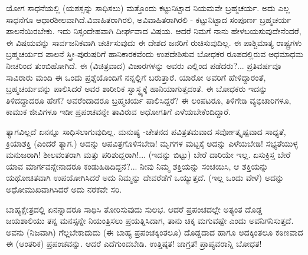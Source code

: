 ಯೋಗ ಸಾಧನೆಯಲ್ಲಿ (ಯಶಸ್ಸನ್ನು ಸಾಧಿಸಲು) ಮತ್ತೊಂದು ಕಟ್ಟುನಿಟ್ಟಾದ ನಿಯಮವೇ ಬ್ರಹ್ಮಚರ್ಯ. ಅದು ಎಲ್ಲ ಸಾಧನೆಗೂ ಆಧಾರಶೀಲವಾಗಿದೆ.\break ವಿವಾಹಿತರಾಗಿರಲಿ, ಅವಿವಾಹಿತರಾಗಿರಲಿ - ಕಟ್ಟುನಿಟ್ಟಾದ ಸಂಪೂರ್ಣ ಬ್ರಹ್ಮಚರ್ಯ ಪಾಲನೆಯಿರಬೇಕು. ಇದು ನಿಸ್ಸಂದೇಹವಾಗಿ ದೀರ್ಘವಾದ ವಿಷಯ. ಆದರೆ ನಿಮಗೆ ನಾನು ಹೇಳಬಯಸುವುದೇನೆಂದರೆ, ಈ ವಿಷಯವನ್ನು ಸಾರ್ವಜನಿಕವಾಗಿ ಚರ್ಚಿಸುವುದು ಈ ದೇಶದ ಜನರಿಗೆ ರುಚಿಸುವುದಿಲ್ಲ. ಈ ಪಾಶ್ಚಿಮಾತ್ಯ ರಾಷ್ಟ್ರಗಳು ಬ್ರಹ್ಮಚರ್ಯದ ಪಾಲನೆ ಸ್ತ್ರೀ-ಪುರುಷರಿಗೆ ಹಾನಿಕಾರಕವೆಂದು ಉಪದೇಶಿಸುವ ಬೋಧಕರ ರೂಪದಲ್ಲಿರುವ ಅಧಮಾಧಮ ನೀಚರಿಂದ ತುಂಬಿಹೋಗಿದೆ. ಈ (ವಿಚಿತ್ರವಾದ) ವಿಚಾರಗಳನ್ನು ಅವರು ಎಲ್ಲಿಂದ ಪಡೆದರು?... ಪ್ರತಿವರ್ಷವೂ ಸಾವಿರಾರು ಮಂದಿ ಈ ಒಂದು ಪ್ರಶ್ನೆಯೊಂದಿಗೆ ನನ್ನಲ್ಲಿಗೆ ಬರುತ್ತಾರೆ. ಯಾರೋ ಅವರಿಗೆ ಹೇಳಿದ್ದಾರಂತೆ, ಬ್ರಹ್ಮಚರ್ಯವನ್ನು ಪಾಲಿಸಿದರೆ ಅವರ ಶಾರೀರಿಕ ಸ್ವಾಸ್ಥ್ಯಕ್ಕೆ ಹಾನಿಯಾಗುತ್ತದಂತೆ. ಈ ಬೋಧಕರು ಇದನ್ನು ತಿಳಿದದ್ದಾದರೂ ಹೇಗೆ? ಅವರೆಂದಾದರೂ ಬ್ರಹ್ಮಚರ್ಯ ಪಾಲಿಸಿದ್ದರೆ? ಈ ಲಂಪಟರೂ, ತಿಳಿಗೇಡಿ ವ್ಯಭಿಚಾರಿಗಳೂ, ಕಾಮುಕ ಜೀವಿಗಳೂ ಇಡೀ ಪ್ರಪಂಚವನ್ನೇ ತಾವಿರುವ ಅಧೋಗತಿಗೆ ಎಳೆಯಬೇಕೆಂದಿದ್ದಾರೆ.

ತ್ಯಾಗವಿಲ್ಲದೆ ಏನನ್ನೂ ಸಾಧಿಸಲಾಗುವುದಿಲ್ಲ. ಮನುಷ್ಯ -ಚೇತನದ ಪವಿತ್ರತಮವಾದ ಸರ್ವೋತ್ಕೃಷ್ಟವಾದ ಸಾಧ್ಯತೆ, ಕ್ರಿಯಾಶಕ್ತಿ (ಎಂದರೆ ತ್ಯಾಗ.) ಅದನ್ನು ಅಪವಿತ್ರಗೊಳಿಸಬೇಡಿ! ಮೃಗಗಳ ಮಟ್ಟಕ್ಕೆ ಅದನ್ನು ಎಳೆಯಬೇಡಿ! ಸಭ್ಯತೆಯುಳ್ಳ ಮನುಜರಾಗಿ! ಶೀಲವಂತರಾಗಿ ಮತ್ತು ಪರಿಶುದ್ದರಾಗಿ!... (ಇದನ್ನು ಬಿಟ್ಟು) ಬೇರೆ ದಾರಿಯೇ ಇಲ್ಲ. ಏಸುಕ್ರಿಸ್ತ ಬೇರೆ ಯಾವ ಮಾರ್ಗವನ್ನೇನಾದರೂ ಕಂಡುಹಿಡಿದಿದ್ದನೆ?... ನೀವು ನಿಮ್ಮ ಶಕ್ತಿಯನ್ನು ಸಂಚಯಿಸಿ, ಆ ಶಕ್ತಿಯನ್ನು ಯಥೋಚಿತವಾಗಿ ಉಪಯೋಗಿಸಿದರೆ ಅದು ನಿಮ್ಮನ್ನು ದೇವರೆಡೆಗೆ ಒಯ್ಯುತ್ತದೆ. (ಇಲ್ಲ ಒಂದು ವೇಳೆ) ಅದನ್ನು ಅಧೋಮುಖವಾಗಿಸಿದರೆ ಅದು ನರಕವೇ ಸರಿ.

ಬಾಹ್ಯಕ್ಷೇತ್ರದಲ್ಲಿ ಏನನ್ನಾದರೂ ಸಾಧಿಸಿ ತೋರಿಸುವುದು ಸುಲಭ. ಆದರೆ ಪ್ರಪಂಚದಲ್ಲೇ ಅತ್ಯಂತ ದೊಡ್ಡ ಜಯಶಾಲಿಯು ತನ್ನ ಮನಸ್ಸನ್ನೇ ನಿಯಂತ್ರಿಸಲು ಪ್ರಯತ್ನಿಸಿದಾಗ, ತಾನು ಚಿಕ್ಕ ಮಗುವಷ್ಟೇ ಎಂದು ಅವನಿಗನಿಸುತ್ತದೆ. ಅವನು (ನಿಜವಾಗಿ) ಗೆಲ್ಲಬೇಕಾದುದು (ಈ ಬಾಹ್ಯ ಪ್ರಪಂಚಕ್ಕಿಂತಲೂ) ದೊಡ್ಡದಾದ ಹಾಗೂ ಅದಕ್ಕಿಂತಲೂ ಕಠಿಣವಾದ ಈ (ಆಂತರಿಕ) ಪ್ರಪಂಚವನ್ನು. ಆದರೆ ಎದೆಗುಂದಬೇಡಿ. ಉತ್ತಿಷ್ಠತ! ಜಾಗ್ರತ! ಪ್ರಾಪ್ಯವರಾನ್ನಿ ಬೋಧತ!

